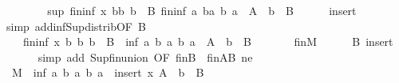\begin{isabellebody}
\ \ \isamarkupfalse%
\ \isamarkupfalse%
\ {\isachardoublequoteopen}{\isasymdots}\ {\isacharequal}{\kern0pt}\ sup\ {\isacharparenleft}{\kern0pt}{\isasymSqunion}\isactrlsub f\isactrlsub i\isactrlsub n{\isacharbraceleft}{\kern0pt}inf\ x\ b{\isacharbar}{\kern0pt}b{\isachardot}{\kern0pt}\ b\ {\isasymin}\ B{\isacharbraceright}{\kern0pt}{\isacharparenright}{\kern0pt}\ {\isacharparenleft}{\kern0pt}{\isasymSqunion}\isactrlsub f\isactrlsub i\isactrlsub n{\isacharbraceleft}{\kern0pt}inf\ a\ b{\isacharbar}{\kern0pt}a\ b{\isachardot}{\kern0pt}\ a\ {\isasymin}\ A\ {\isasymand}\ b\ {\isasymin}\ B{\isacharbraceright}{\kern0pt}{\isacharparenright}{\kern0pt}{\isachardoublequoteclose}\isanewline
\ \ \ \ \isamarkupfalse%
\ insert\ \isamarkupfalse%
{\isacharparenleft}{\kern0pt}simp\ add{\isacharcolon}{\kern0pt}inf{\isacharunderscore}{\kern0pt}Sup{}{\isacharunderscore}{\kern0pt}distrib{\isacharbrackleft}{\kern0pt}OF\ B{\isacharbrackright}{\kern0pt}{\isacharparenright}{\kern0pt}\isanewline
\ \ \isamarkupfalse%
\ \isamarkupfalse%
\ {\isachardoublequoteopen}{\isasymdots}\ {\isacharequal}{\kern0pt}\ {\isasymSqunion}\isactrlsub f\isactrlsub i\isactrlsub n{\isacharparenleft}{\kern0pt}{\isacharbraceleft}{\kern0pt}inf\ x\ b\ {\isacharbar}{\kern0pt}b{\isachardot}{\kern0pt}\ b\ {\isasymin}\ B{\isacharbraceright}{\kern0pt}\ {\isasymunion}\ {\isacharbraceleft}{\kern0pt}inf\ a\ b\ {\isacharbar}{\kern0pt}a\ b{\isachardot}{\kern0pt}\ a\ {\isasymin}\ A\ {\isasymand}\ b\ {\isasymin}\ B{\isacharbraceright}{\kern0pt}{\isacharparenright}{\kern0pt}{\isachardoublequoteclose}\isanewline
\ \ \ \ {\isacharparenleft}{\kern0pt}\ {\isachardoublequoteopen}{\isacharunderscore}{\kern0pt}\ {\isacharequal}{\kern0pt}\ {\isasymSqunion}\isactrlsub f\isactrlsub i\isactrlsub n{\isacharquery}{\kern0pt}M{\isachardoublequoteclose}{\isacharparenright}{\kern0pt}\isanewline
\ \ \ \ \isamarkupfalse%
\ B\ insert\isanewline
\ \ \ \ \isamarkupfalse%
\ {\isacharparenleft}{\kern0pt}simp\ add{\isacharcolon}{\kern0pt}\ Sup{\isacharunderscore}{\kern0pt}fin{\isachardot}{\kern0pt}union\ {\isacharbrackleft}{\kern0pt}OF\ finB\ {\isacharunderscore}{\kern0pt}\ finAB\ ne{\isacharbrackright}{\kern0pt}{\isacharparenright}{\kern0pt}\isanewline
\ \ \isamarkupfalse%
\ \isamarkupfalse%
\ {\isachardoublequoteopen}{\isacharquery}{\kern0pt}M\ {\isacharequal}{\kern0pt}\ {\isacharbraceleft}{\kern0pt}inf\ a\ b\ {\isacharbar}{\kern0pt}a\ b{\isachardot}{\kern0pt}\ a\ {\isasymin}\ insert\ x\ A\ {\isasymand}\ b\ {\isasymin}\ B{\isacharbraceright}{\kern0pt}{\isachardoublequoteclose}\isanewline

\end{isabellebody}
